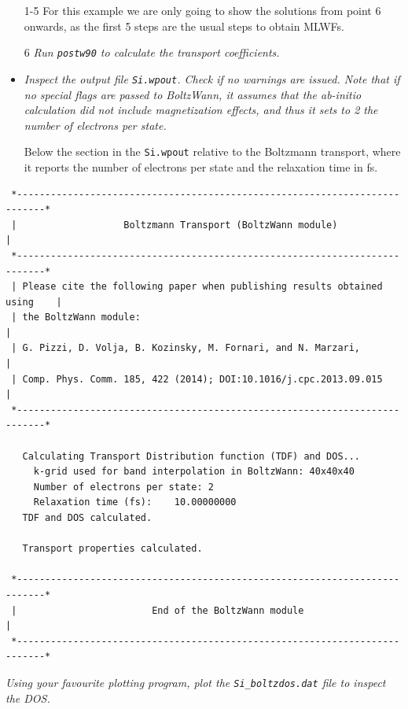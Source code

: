 \begin{itemize}
	\item[1-5] For this example we are only going to show the solutions from point 6 onwards, as the first 5 steps are the usual steps to obtain MLWFs.
	\item[6] {\it Run {\tt postw90} to calculate the transport coefficients.}
	\item {\it Inspect the output file {\tt Si.wpout}. Check if no warnings are issued. Note that if no special flags are passed to {\sc BoltzWann}, it assumes that the {\it ab-initio} calculation did not include magnetization effects, and thus it sets to 2 the number of electrons per state.}

Below the section in the {\tt Si.wpout} relative to the Boltzmann transport, where it reports the number of electrons per state and the relaxation time in fs.
\end{itemize}
\begin{tcolorbox}[sharp corners,boxrule=0.5pt]
{\small
\begin{verbatim}
 *---------------------------------------------------------------------------*
 |                   Boltzmann Transport (BoltzWann module)                  |
 *---------------------------------------------------------------------------*
 | Please cite the following paper when publishing results obtained using    |
 | the BoltzWann module:                                                     |
 | G. Pizzi, D. Volja, B. Kozinsky, M. Fornari, and N. Marzari,              |
 | Comp. Phys. Comm. 185, 422 (2014); DOI:10.1016/j.cpc.2013.09.015          |
 *---------------------------------------------------------------------------*

   Calculating Transport Distribution function (TDF) and DOS...
     k-grid used for band interpolation in BoltzWann: 40x40x40
     Number of electrons per state: 2
     Relaxation time (fs):    10.00000000     
   TDF and DOS calculated.

   Transport properties calculated.

 *---------------------------------------------------------------------------*
 |                        End of the BoltzWann module                        |
 *---------------------------------------------------------------------------*
\end{verbatim}
}
\end{tcolorbox}  


{\it Using your favourite plotting program, plot the {\tt Si\_boltzdos.dat} file to inspect the DOS.}

